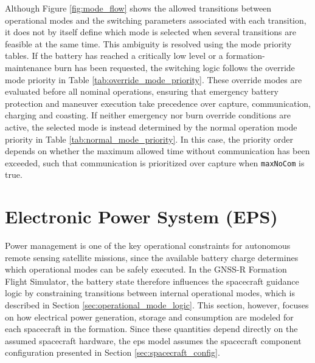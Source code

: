 Although Figure \ref{fig:mode_flow} shows the allowed transitions between operational modes and the switching parameters associated with each transition, it does not by itself define which mode is selected when several transitions are feasible at the same time. This ambiguity is resolved using the mode priority tables. If the battery has reached a critically low level or a formation-maintenance burn has been requested, the switching logic follows the override mode priority in Table \ref{tab:override_mode_priority}. These override modes are evaluated before all nominal operations, ensuring that emergency battery protection and maneuver execution take precedence over capture, communication, charging and coasting. If neither emergency nor burn override conditions are active, the selected mode is instead determined by the normal operation mode priority in Table \ref{tab:normal_mode_priority}. In this case, the priority order depends on whether the maximum allowed time without communication has been exceeded, such that communication is prioritized over capture when \texttt{maxNoCom} is true.


\section{Electronic Power System (EPS)} 
\label{sec:eps}
Power management is one of the key operational constraints for autonomous remote sensing satellite missions, since the available battery charge determines which operational modes can be safely executed. In the GNSS-R Formation Flight Simulator, the battery state therefore influences the spacecraft guidance logic by constraining transitions between internal operational modes, which is described in Section \ref{sec:operational_mode_logic}. This section, however, focuses on how electrical power generation, storage and consumption are modeled for each spacecraft in the formation. Since these quantities depend directly on the assumed spacecraft hardware, the \gls{eps} model assumes the spacecraft component configuration presented in Section \ref{sec:spacecraft_config}.


